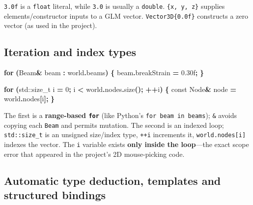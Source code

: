 \documentclass[
  10pt,
  a4paper,
]{article}
\newenvironment{Shaded}{\begin{snugshade}}{\end{snugshade}}
\newcommand{\AttributeTok}[1]{\textcolor[rgb]{0.13,0.29,0.53}{#1}}
\newcommand{\BuiltInTok}[1]{#1}
\newcommand{\ControlFlowTok}[1]{\textcolor[rgb]{0.13,0.29,0.53}{\textbf{#1}}}
\newcommand{\DecValTok}[1]{\textcolor[rgb]{0.00,0.00,0.81}{#1}}
\newcommand{\FloatTok}[1]{\textcolor[rgb]{0.00,0.00,0.81}{#1}}
\newcommand{\NormalTok}[1]{#1}
\newcommand{\OperatorTok}[1]{\textcolor[rgb]{0.81,0.36,0.00}{\textbf{#1}}}
\begin{document}
\texttt{3.0f} is a \texttt{float} literal, while \texttt{3.0} is usually
a \texttt{double}. \texttt{\{x,\ y,\ z\}} supplies elements/constructor
inputs to a GLM vector. \texttt{Vector3D\{0.0f\}} constructs a zero
vector (as used in the project).

\subsection{Iteration and index types}\label{iteration-and-index-types}

\begin{Shaded}
\begin{Highlighting}[]
\ControlFlowTok{for} \OperatorTok{(}\NormalTok{Beam}\OperatorTok{\&}\NormalTok{ beam }\OperatorTok{:}\NormalTok{ world}\OperatorTok{.}\NormalTok{beams}\OperatorTok{)} \OperatorTok{\{}
\NormalTok{    beam}\OperatorTok{.}\NormalTok{breakStrain }\OperatorTok{=} \FloatTok{0.30}\BuiltInTok{f}\OperatorTok{;}
\OperatorTok{\}}

\ControlFlowTok{for} \OperatorTok{(}\BuiltInTok{std::}\NormalTok{size\_t i }\OperatorTok{=} \DecValTok{0}\OperatorTok{;}\NormalTok{ i }\OperatorTok{\textless{}}\NormalTok{ world}\OperatorTok{.}\NormalTok{nodes}\OperatorTok{.}\NormalTok{size}\OperatorTok{();} \OperatorTok{++}\NormalTok{i}\OperatorTok{)} \OperatorTok{\{}
    \AttributeTok{const}\NormalTok{ Node}\OperatorTok{\&}\NormalTok{ node }\OperatorTok{=}\NormalTok{ world}\OperatorTok{.}\NormalTok{nodes}\OperatorTok{[}\NormalTok{i}\OperatorTok{];}
\OperatorTok{\}}
\end{Highlighting}
\end{Shaded}

The first is a \textbf{range-based \texttt{for}} (like Python's
\texttt{for\ beam\ in\ beams}); \texttt{\&} avoids copying each
\texttt{Beam} and permits mutation. The second is an indexed loop;
\texttt{std::size\_t} is an unsigned size/index type, \texttt{++i}
increments it, \texttt{world.nodes{[}i{]}} indexes the vector. The
\texttt{i} variable exists \textbf{only inside the loop}---the exact
scope error that appeared in the project's 2D mouse-picking code.

\subsection{Automatic type deduction, templates and structured
bindings}\label{automatic-type-deduction-templates-and-structured-bindings}
\end{document}
